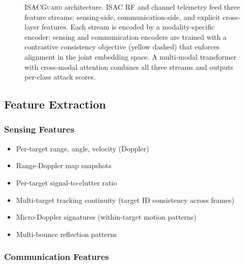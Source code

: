 \documentclass[sigconf,nonacm]{acmart}
\begin{document}
\begin{figure}[t]
\caption{\textsc{ISACGuard} architecture. ISAC RF and channel
  telemetry feed three feature streams: sensing-side, communication-side,
  and explicit cross-layer features. Each stream is encoded by a
  modality-specific encoder; sensing and communication encoders are
  trained with a contrastive consistency objective (yellow dashed) that
  enforces alignment in the joint embedding space. A multi-modal
  transformer with cross-modal attention combines all three streams
  and outputs per-class attack scores.}
\label{fig:framework}
\end{figure}

\subsection{Feature Extraction}

\subsubsection{Sensing Features}

\begin{itemize}
  \item Per-target range, angle, velocity (Doppler)
  \item Range-Doppler map snapshots
  \item Per-target signal-to-clutter ratio
  \item Multi-target tracking continuity (target ID consistency
        across frames)
  \item Micro-Doppler signatures (within-target motion patterns)
  \item Multi-bounce reflection patterns
\end{itemize}

\subsubsection{Communication Features}
\end{document}
